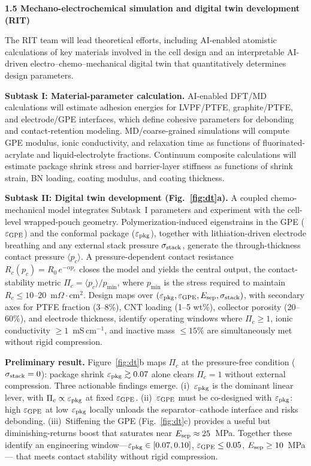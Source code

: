 \documentclass[11pt,letterpaper]{article}
\begin{document}
\noindent\textbf{1.5 Mechano-electrochemical simulation and digital
twin development (RIT)}

The RIT team will lead theoretical efforts, including AI-enabled
atomistic calculations of key materials involved in the cell design
and an interpretable AI-driven electro--chemo--mechanical digital twin
that quantitatively determines design parameters.

\textbf{Subtask I: Material-parameter calculation.}
AI-enabled DFT/MD calculations will estimate adhesion energies for
LVPF/PTFE, graphite/PTFE, and electrode/GPE interfaces, which define
cohesive parameters for debonding and contact-retention modeling.
MD/coarse-grained simulations will compute GPE modulus, ionic
conductivity, and relaxation time as functions of fluorinated-acrylate
and liquid-electrolyte fractions.  Continuum composite calculations
will estimate package shrink stress and barrier-layer stiffness as
functions of shrink strain, BN loading, coating modulus, and coating
thickness.

\textbf{Subtask II: Digital twin development (Fig.~\ref{fig:dt}a).}
A coupled chemo-mechanical model integrates Subtask~I parameters and
experiment with the cell-level wrapped-pouch geometry.
Polymerization-induced eigenstrains in the GPE
($\varepsilon_{\rm GPE}$) and the conformal package
($\varepsilon_{\rm pkg}$), together with lithiation-driven electrode
breathing and any external stack pressure $\sigma_{\rm stack}$,
generate the through-thickness contact pressure $\langle p_c\rangle$.
A pressure-dependent contact resistance
$R_c(p_c) = R_0\,e^{-\alpha p_c}$ closes the model and yields the
central output, the contact-stability metric
$\Pi_c = \langle p_c\rangle/p_{\min}$, where $p_{\min}$ is the stress
required to maintain $R_c \le 10$--$20$~m$\Omega\cdot$cm$^2$.  Design
maps over $(\varepsilon_{\rm pkg}, \varepsilon_{\rm GPE}, E_{\rm sep},
\sigma_{\rm stack})$, with secondary axes for PTFE fraction (3--8\%),
CNT loading (1--5 wt\%), collector porosity (20--60\%), and electrode
thickness, identify operating windows where $\Pi_c \ge 1$, ionic
conductivity $\ge 1$~mS\,cm$^{-1}$, and inactive mass $\le 15\%$ are
simultaneously met without rigid compression.

\textbf{Preliminary result.}
Figure~\ref{fig:dt}b maps $\Pi_c$ at the pressure-free condition
($\sigma_{\rm stack}=0$): package shrink $\varepsilon_{\rm pkg} \gtrsim
0.07$ alone clears $\Pi_c = 1$ without external compression.  Three
actionable findings emerge.  (i)~$\varepsilon_{\rm pkg}$ is the
dominant linear lever, with $\Pi_c \propto \varepsilon_{\rm pkg}$ at
fixed $\varepsilon_{\rm GPE}$.  (ii)~$\varepsilon_{\rm GPE}$ must be
co-designed with $\varepsilon_{\rm pkg}$: high $\varepsilon_{\rm GPE}$
at low $\varepsilon_{\rm pkg}$ locally unloads the separator--cathode
interface and risks debonding.  (iii)~Stiffening the GPE
(Fig.~\ref{fig:dt}c) provides a useful but diminishing-returns boost
that saturates near $E_{\rm sep} \approx 25$~MPa.  Together these
identify an engineering window---$\varepsilon_{\rm pkg} \in [0.07,
0.10]$, $\varepsilon_{\rm GPE} \le 0.05$, $E_{\rm sep} \ge 10$~MPa---
that meets contact stability without rigid compression.
\end{document}
